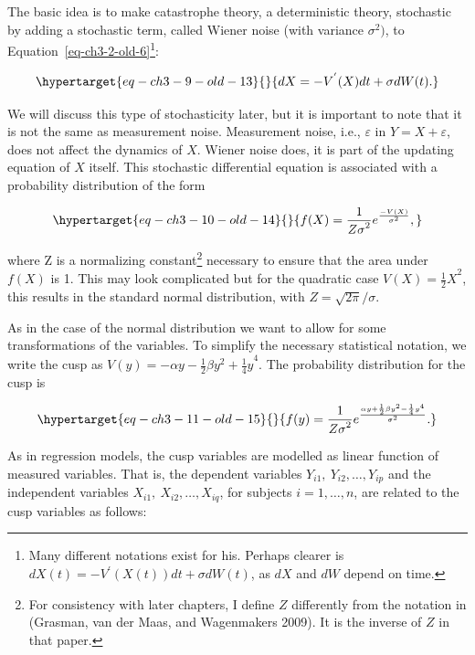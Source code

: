 \documentclass[
  a4paper,
  DIV=11,
  numbers=noendperiod]{scrreprt}
\begin{document}
The basic idea is to make catastrophe theory, a deterministic theory,
stochastic by adding a stochastic term, called Wiener noise (with
variance \(\sigma^{2})\), to Equation~\ref{eq-ch3-2-old-6}\footnote{Many
  different notations exist for his. Perhaps clearer is
  \(dX(t) = - V^{'}\left( X(t) \right)dt + \sigma dW(t)\), as \(dX\) and
  \(dW\) depend on time.}:

\begin{equation}\protect\hypertarget{eq-ch3-9-old-13}{}{
dX = - V^{'}(X)dt + \sigma dW(t).}\label{eq-ch3-9-old-13}\end{equation}

We will discuss this type of stochasticity later, but it is important to
note that it is not the same as measurement noise. Measurement noise,
i.e., \(\varepsilon\) in \(Y = X + \varepsilon\), does not affect the
dynamics of \(X\). Wiener noise does, it is part of the updating
equation of \(X\) itself. This stochastic differential equation is
associated with a probability distribution of the form

\begin{equation}\protect\hypertarget{eq-ch3-10-old-14}{}{
f(X) = \frac{1}{{Z\sigma}^{2}}e^{\frac{- V(X)}{\sigma^{2}}},}\label{eq-ch3-10-old-14}\end{equation}

where Z is a normalizing constant\footnote{For consistency with later
  chapters, I define \(Z\) differently from the notation in (Grasman,
  van der Maas, and Wagenmakers 2009). It is the inverse of \(Z\) in
  that paper.} necessary to ensure that the area under \(f(X)\) is 1.
This may look complicated but for the quadratic case
\(V(X) = {\frac{1}{2}X}^{2}\), this results in the standard normal
distribution, with \(Z = {\sqrt{2\pi}}/{\sigma}\).

As in the case of the normal distribution we want to allow for some
transformations of the variables. To simplify the necessary statistical
notation, we write the cusp as
\(V(y) = {- \alpha y - \frac{1}{2}\beta y^{2} + \frac{1}{4}y}^{4}\). The
probability distribution for the cusp is

\begin{equation}\protect\hypertarget{eq-ch3-11-old-15}{}{
f(y) = \frac{1}{{Z\sigma}^{2}}e^{\frac{\alpha y + \frac{1}{2}\beta y^{2} - \frac{1}{4}y^{4}}{\sigma^{2}}}.}\label{eq-ch3-11-old-15}\end{equation}

As in regression models, the cusp variables are modelled as linear
function of measured variables. That is, the dependent variables
\(Y_{i1},\ Y_{i2},\ldots,Y_{ip}\) and the independent variables
\(X_{i1},\ X_{i2},\ldots,X_{iq}\), for subjects \(i = 1,\ldots,n\), are
related to the cusp variables as follows:
\end{document}
